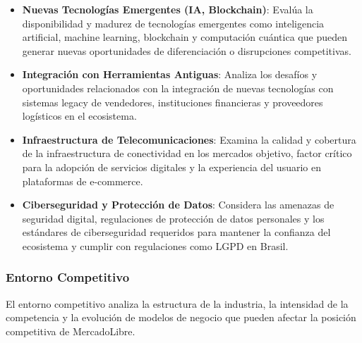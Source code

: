 \begin{itemize}
\item \textbf{Nuevas Tecnologías Emergentes (IA, Blockchain)}: Evalúa la disponibilidad y madurez de tecnologías emergentes como inteligencia artificial, machine learning, blockchain y computación cuántica que pueden generar nuevas oportunidades de diferenciación o disrupciones competitivas.

\item \textbf{Integración con Herramientas Antiguas}: Analiza los desafíos y oportunidades relacionados con la integración de nuevas tecnologías con sistemas legacy de vendedores, instituciones financieras y proveedores logísticos en el ecosistema.

\item \textbf{Infraestructura de Telecomunicaciones}: Examina la calidad y cobertura de la infraestructura de conectividad en los mercados objetivo, factor crítico para la adopción de servicios digitales y la experiencia del usuario en plataformas de e-commerce.

\item \textbf{Ciberseguridad y Protección de Datos}: Considera las amenazas de seguridad digital, regulaciones de protección de datos personales y los estándares de ciberseguridad requeridos para mantener la confianza del ecosistema y cumplir con regulaciones como LGPD en Brasil.
\end{itemize}

\subsubsection{Entorno Competitivo}

El entorno competitivo analiza la estructura de la industria, la intensidad de la competencia y la evolución de modelos de negocio que pueden afectar la posición competitiva de MercadoLibre.

